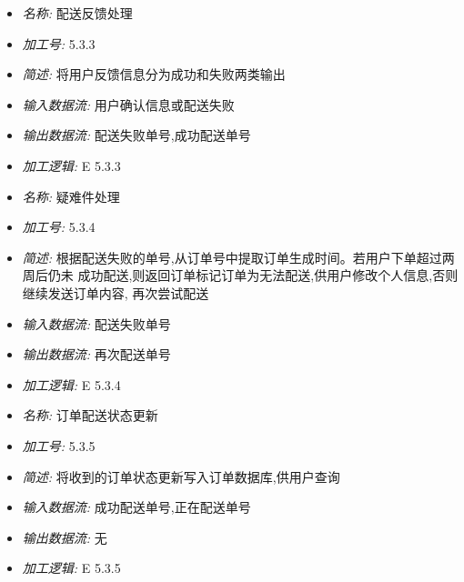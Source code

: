 \documentclass{article}
\begin{document}
\begin{CJK*}{UTF8}{gbsn}
\begin{itemize}
\end{itemize}


\vspace{-1mm}


\begin{itemize}
\item \textit{名称: }配送反馈处理
\item \textit{加工号: }5.3.3
\item \textit{简述: } 将用户反馈信息分为成功和失败两类输出
\item \textit{输入数据流: } 用户确认信息或配送失败 
\item \textit{输出数据流: } 配送失败单号,成功配送单号 
\item \textit{加工逻辑: } E 5.3.3

\end{itemize}


\vspace{-1mm}


\begin{itemize}
\item \textit{名称: }疑难件处理
\item \textit{加工号: }5.3.4
\item \textit{简述: } 根据配送失败的单号,从订单号中提取订单生成时间。若用户下单超过两周后仍未 成功配送,则返回订单标记订单为无法配送,供用户修改个人信息,否则继续发送订单内容, 再次尝试配送
\item \textit{输入数据流: } 配送失败单号
\item \textit{输出数据流: } 再次配送单号
\item \textit{加工逻辑: } E 5.3.4

\end{itemize}


\vspace{-1mm}


\begin{itemize}
\item \textit{名称: }订单配送状态更新
\item \textit{加工号: }5.3.5
\item \textit{简述: } 将收到的订单状态更新写入订单数据库,供用户查询 
\item \textit{输入数据流: } 成功配送单号,正在配送单号
\item \textit{输出数据流: } 无
\item \textit{加工逻辑: } E 5.3.5

\end{itemize}


\vspace{-1mm}



\end{CJK*}
\end{document}
